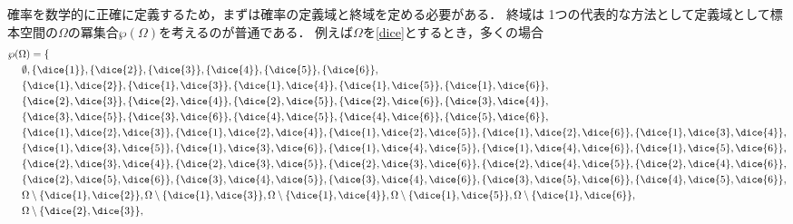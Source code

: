 \documentclass[main.tex]{subfiles}
\begin{document}
確率を数学的に正確に定義するため，まずは確率の定義域と終域を定める必要がある．
終域は
1つの代表的な方法として定義域として標本空間の\(\Omega\)の冪集合\(\wp(\Omega)\)を考えるのが普通である．
例えば\(\Omega\)を\eqref{dice}とするとき，多くの場合
\begin{align*}
    & \wp(\Omega) = \{ \\
    & \ \ \ \ \emptyset, \{\dice{1}\}, \{\dice{2}\}, \{\dice{3}\}, \{\dice{4}\}, \{\dice{5}\}, \{\dice{6}\}, \\
    & \ \ \ \ 
        \{\dice{1}, \dice{2}\},
        \{\dice{1}, \dice{3}\},
        \{\dice{1}, \dice{4}\},
        \{\dice{1}, \dice{5}\},
        \{\dice{1}, \dice{6}\}, \\
    & \ \ \ \ 
        \{\dice{2}, \dice{3}\},
        \{\dice{2}, \dice{4}\},
        \{\dice{2}, \dice{5}\},
        \{\dice{2}, \dice{6}\},
        \{\dice{3}, \dice{4}\}, \\
    & \ \ \ \ 
        \{\dice{3}, \dice{5}\},
        \{\dice{3}, \dice{6}\},
        \{\dice{4}, \dice{5}\},
        \{\dice{4}, \dice{6}\},
        \{\dice{5}, \dice{6}\}, \\
    & \ \ \ \ 
        \{\dice{1}, \dice{2}, \dice{3}\},
        \{\dice{1}, \dice{2}, \dice{4}\},
        \{\dice{1}, \dice{2}, \dice{5}\},
        \{\dice{1}, \dice{2}, \dice{6}\},
        \{\dice{1}, \dice{3}, \dice{4}\}, \\
    & \ \ \ \ 
        \{\dice{1}, \dice{3}, \dice{5}\},
        \{\dice{1}, \dice{3}, \dice{6}\},
        \{\dice{1}, \dice{4}, \dice{5}\},
        \{\dice{1}, \dice{4}, \dice{6}\},
        \{\dice{1}, \dice{5}, \dice{6}\}, \\
    & \ \ \ \ 
        \{\dice{2}, \dice{3}, \dice{4}\},
        \{\dice{2}, \dice{3}, \dice{5}\},
        \{\dice{2}, \dice{3}, \dice{6}\},
        \{\dice{2}, \dice{4}, \dice{5}\},
        \{\dice{2}, \dice{4}, \dice{6}\}, \\
    & \ \ \ \ 
        \{\dice{2}, \dice{5}, \dice{6}\},
        \{\dice{3}, \dice{4}, \dice{5}\},
        \{\dice{3}, \dice{4}, \dice{6}\},
        \{\dice{3}, \dice{5}, \dice{6}\},
        \{\dice{4}, \dice{5}, \dice{6}\}, \\
    & \ \ \ \ 
        \Omega \setminus \{\dice{1}, \dice{2}\},
        \Omega \setminus \{\dice{1}, \dice{3}\},
        \Omega \setminus \{\dice{1}, \dice{4}\},
        \Omega \setminus \{\dice{1}, \dice{5}\},
        \Omega \setminus \{\dice{1}, \dice{6}\}, \\
    & \ \ \ \ 
        \Omega \setminus \{\dice{2}, \dice{3}\},

\end{align*}
\end{document}
